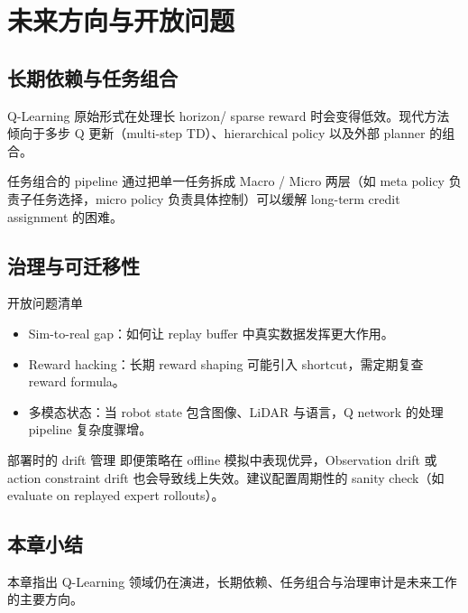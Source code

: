 \section{未来方向与开放问题}

\subsection{长期依赖与任务组合}

Q-Learning 原始形式在处理长 horizon/ sparse reward 时会变得低效。现代方法倾向于多步 Q 更新（multi-step TD）、hierarchical policy 以及外部 planner 的组合。

\begin{importantbox}{任务组合的 pipeline}
通过把单一任务拆成 Macro / Micro 两层（如 meta policy 负责子任务选择，micro policy 负责具体控制）可以缓解 long-term credit assignment 的困难。
\end{importantbox}

\subsection{治理与可迁移性}

\begin{knowledgebox}{开放问题清单}
\begin{itemize}
    \item Sim-to-real gap：如何让 replay buffer 中真实数据发挥更大作用。
    \item Reward hacking：长期 reward shaping 可能引入 shortcut，需定期复查 reward formula。
    \item 多模态状态：当 robot state 包含图像、LiDAR 与语言，Q network 的处理 pipeline 复杂度骤增。
\end{itemize}
\end{knowledgebox}

\begin{warningbox}{部署时的 drift 管理}
即便策略在 offline 模拟中表现优异，Observation drift 或 action constraint drift 也会导致线上失效。建议配置周期性的 sanity check（如 evaluate on replayed expert rollouts）。
\end{warningbox}

\subsection{本章小结}

本章指出 Q-Learning 领域仍在演进，长期依赖、任务组合与治理审计是未来工作的主要方向。

